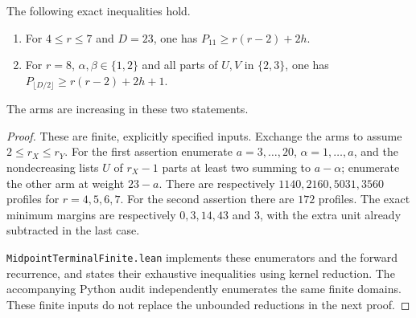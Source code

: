 \begin{lemma}
The following exact inequalities hold.
\begin{enumerate}
\item For $4\le r\le7$ and $D=23$, one has
      $P_{11}\ge r(r-2)+2h$.
\item For $r=8$, $\alpha,\beta\in\{1,2\}$ and all parts of
      $U,V$ in $\{2,3\}$, one has
      $P_{\lfloor D/2\rfloor}\ge r(r-2)+2h+1$.
\end{enumerate}
The arms are increasing in these two statements.
\end{lemma}
\begin{proof}
These are finite, explicitly specified inputs. Exchange the arms to
assume $2\le r_X\le r_Y$. For the first assertion enumerate
$a=3,\ldots,20$, $\alpha=1,\ldots,a$, and the nondecreasing lists
$U$ of $r_X-1$ parts at least two summing to $a-\alpha$; enumerate
the other arm at weight $23-a$. There are respectively
$1140,2160,5031,3560$ profiles for $r=4,5,6,7$.
For the second assertion there are $172$ profiles. The exact minimum
margins are respectively $0,3,14,43$ and $3$, with the extra unit
already subtracted in the last case.

\texttt{MidpointTerminalFinite.lean} implements these enumerators and
the forward recurrence, and states their exhaustive inequalities using
kernel reduction. The accompanying Python audit independently enumerates
the same finite domains. These finite inputs do not replace the
unbounded reductions in the next proof.
\end{proof}

